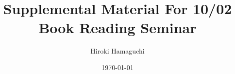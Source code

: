 \documentclass[a4paper, 14pt, dvipdfmx]{extarticle}
\begin{document}
\title{Supplemental Material For 10/02\\Book Reading Seminar}
\author{Hiroki Hamaguchi}
\date{\today}
\maketitle










\end{document}
